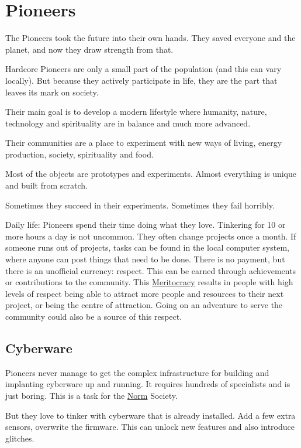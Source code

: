 \section{Pioneers}
\label{sec:Pioneers}

The Pioneers took the future into their own hands. They saved everyone and the planet, and now they draw strength from that.

Hardcore Pioneers are only a small part of the population (and this can vary locally). But because they actively participate in life, they are the part that leaves its mark on society.

Their main goal is to develop a modern lifestyle where humanity, nature, technology and spirituality are in balance and much more advanced.

Their communities are a place to experiment with new ways of living, energy production, society, spirituality and food.

Most of the objects are prototypes and experiments. Almost everything is unique and built from scratch.

Sometimes they succeed in their experiments. Sometimes they fail horribly.


Daily life: Pioneers spend their time doing what they love. Tinkering for 10 or more hours a day is not uncommon. They often change projects once a month. If someone runs out of projects, tasks can be found in the local computer system, where anyone can post things that need to be done. There is no payment, but there is an unofficial currency: respect. This can be earned through achievements or contributions to the community. This \hyperref[sec:meritocracy]{Meritocracy} results in people with high levels of respect being able to attract more people and resources to their next project, or being the centre of attraction.
Going on an adventure to serve the community could also be a source of this respect.

\subsection{Cyberware}
\label{sec:Cyberware Pioneers}

Pioneers never manage to get the complex infrastructure for building and implanting cyberware up and running. It requires hundreds of specialists and is just boring. This is a task for the \hyperref[sec:Cyberware Norm]{Norm} Society.

But they love to tinker with cyberware that is already installed. Add a few extra sensors, overwrite the firmware. This can unlock new features and also introduce glitches.


